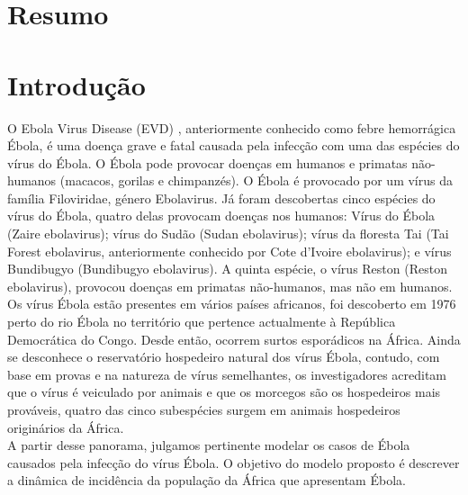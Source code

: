 \documentclass[12pt,a4paper]{article}
\begin{document}
 

\thispagestyle{primeira}



\section*{Resumo}

\section*{Introdução}
O Ebola Virus Disease (EVD) , anteriormente conhecido como febre hemorrágica Ébola, é uma doença grave e fatal causada pela infecção com uma das espécies do vírus do Ébola. O Ébola pode provocar doenças em humanos e primatas não-humanos (macacos, gorilas e chimpanzés).
O Ébola é provocado por um vírus da família Filoviridae, género
Ebolavirus. Já foram descobertas cinco espécies do vírus do Ébola, quatro delas provocam doenças nos humanos: Vírus do Ébola (Zaire
ebolavirus); vírus do Sudão (Sudan ebolavirus); vírus da floresta
Tai (Tai Forest ebolavirus, anteriormente conhecido por Cote
d'Ivoire ebolavirus); e vírus Bundibugyo (Bundibugyo ebolavirus).
A quinta espécie, o vírus Reston (Reston ebolavirus), provocou
doenças em primatas não-humanos, mas não em humanos.\\
Os vírus Ébola estão presentes em vários países africanos,
foi descoberto em 1976 perto do rio Ébola no território que
pertence actualmente à República Democrática do Congo. Desde
então, ocorrem surtos esporádicos na África. Ainda se desconhece o reservatório hospedeiro natural dos vírus Ébola, contudo, com base em provas e na natureza de vírus semelhantes,
os investigadores acreditam que o vírus é veiculado por animais e que os morcegos são os hospedeiros mais prováveis, quatro das cinco subespécies surgem em animais hospedeiros originários da África. \\
A partir desse panorama, julgamos pertinente modelar os casos de Ébola causados pela infecção do vírus Ébola. O objetivo do modelo proposto é descrever a dinâmica de incidência da população da África que apresentam Ébola. 


\newpage
\pagestyle{normal}
\end{document}
